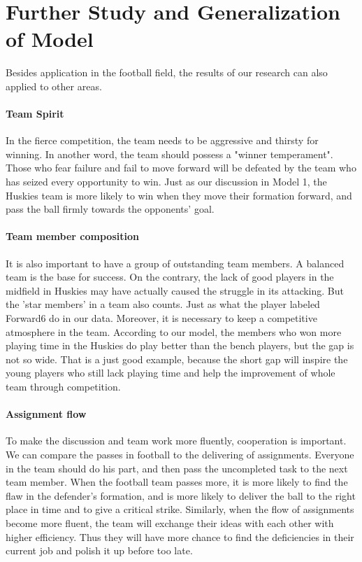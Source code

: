 \documentclass[12pt]{mcmthesis}
\begin{document}
\section{Further Study and Generalization of Model}
Besides application in the football field, the results of our research can also applied to other areas. 

\paragraph{Team Spirit}
In the fierce competition, the team needs to be aggressive and thirsty for winning. In another word, the team should possess a "winner temperament". Those who fear failure and fail to move forward will be defeated by the team who has seized every opportunity to win. Just as our discussion in Model 1, the Huskies team is more likely to win when they move their formation forward, and pass the ball firmly towards the opponents' goal.

\paragraph{Team member composition}
It is also important to have a group of outstanding team members. A balanced team is the base for success. On the contrary, the lack of good players in the midfield in Huskies may have actually caused the struggle in its attacking. But the 'star members' in a team also counts. Just as what the player labeled Forward6 do in our data. 
Moreover, it is necessary to keep a competitive atmosphere in the team. According to our model, the members who won more playing time in the Huskies do play better than the bench players, but the gap is not so wide. That is a just good example, because the short gap will inspire the young players who still lack playing time and help the improvement of whole team through competition. 

\paragraph{Assignment flow}
To make the discussion and team work more fluently, cooperation is important. We can compare the passes in football to the delivering of assignments. Everyone in the team should do his part, and then pass the uncompleted task to the next team member. When the football team passes more, it is more likely to find the flaw in the defender's formation, and is more likely to deliver the ball to the right place in time and to give a critical strike. Similarly, when the flow of assignments become more fluent, the team will exchange their ideas with each other with higher efficiency. Thus they will have more chance to find the deficiencies in their current job and polish it up before too late. 
\end{document}
